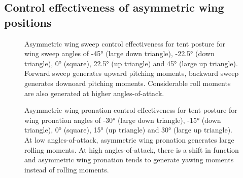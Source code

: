 \subsection{Control effectiveness of asymmetric wing positions}
\begin{figure}
\caption{Asymmetric wing sweep control effectiveness for tent posture for wing sweep angles of \ang{-45} (large down triangle), \ang{-22.5} (down triangle), \ang{0} (square), \ang{+22.5} (up triangle) and \ang{+45} (large up triangle). Forward sweep generates upward pitching moments, backward sweep generates downoard pitching moments.  Considerable roll moments are also generated at higher angles-of-attack.}
\end{figure}
\begin{figure}
\caption{Asymmetric wing pronation control effectiveness for tent posture for wing pronation angles of \ang{-30} (large down triangle), \ang{-15} (down triangle), \ang{0} (square), \ang{+15} (up triangle) and \ang{+30} (large up triangle). At low angles-of-attack, asymmetric wing pronation generates large rolling moments.  At high angles-of-attack, there is a shift in function and asymmetric wing pronation tends to generate yawing moments instead of rolling moments.}
\end{figure}
